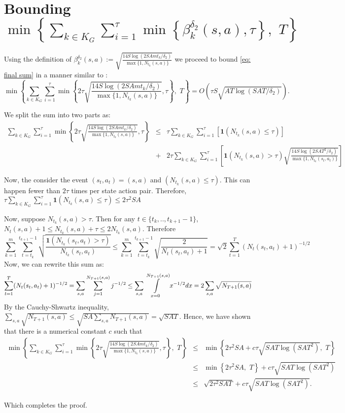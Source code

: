 \appendix
\section{Bounding $\min \left\{\sum_{k\in K_G} \sum_{i=1}^{\tau} \min\left\{ \beta_k^{\delta_2}(s,a), \tau\right\}, \,\, T \right\}$} 

Using the definition of $\beta_k^{\delta_2}(s,a) := \sqrt{\frac{14 S \log(2SAm t_k / \delta_{2})}{\max \{1,N_{t_k}(s,a) \}} }$
we proceed to bound \eqref{eq: final sum} in a manner similar to \cite{jaksch2010near}:
$$ \min \left\{\sum_{k\in K_G} \sum_{i=1}^{\tau} \min\left\{ 2\tau\sqrt{\frac{14 S \log(2SAm t_k / \delta_2)}{\max \{1,N_{t_k}(s,a) \}} }, \tau\right\}, \,\, T \right\}= O\left(\tau S \sqrt{ AT \log(SAT/ \delta_{2})}\right).$$

We split the sum into two parts as: 
\begin{eqnarray}	
\sum_{k\in K_G} \sum_{i=1}^{\tau} \min\left\{ 2\tau\sqrt{\frac{14 S \log(2SAm t_k / \delta_2)}{\max \{1,N_{t_k}(s,a) \}} }, \tau\right\} &\leq& \tau \sum_{k\in K_G}\sum_{i=1}^{\tau}\left[ \mathbf{1}(N_{t_k}(s,a) \leq \tau) \right] \\
&+& 2\tau \sum_{k\in K_G}\sum_{i=1}^{\tau}\left[ \mathbf{1}(N_{t_k}(s,a) > \tau)\sqrt{\frac{14 S \log(2SAT^2 / \delta_2)}{\max \{1,N_{t_k}(s_t,a_t) \}} }  \right] 
\end{eqnarray}

Now, the consider the event $(s_t, a_t)=(s,a)$ and $(N_{t_k}(s,a) \leq \tau)$. This can happen fewer than $2\tau$ times per state action pair. Therefore, $\tau \sum_{k\in K_G}\sum_{i=1}^{\tau}\mathbf{1}(N_{t_k}(s,a) \leq \tau) \leq 2\tau^2 SA$ 

Now, suppose $N_{t_k}(s,a)>\tau$. Then for any $t\in \{t_k,..,t_{k+1}-1\}$, $N_{t}(s,a)+1 \leq N_{t_k}(s,a)+\tau \leq 2N_{t_k}(s,a)$. Therefore 
\begin{equation}
 \sum_{k=1}^{m} \sum_{t=t_k}^{t_{k+1}-1} \sqrt{\frac{\mathbf{1}(N_{t_k}(s_t, a_t)>\tau)}{N_{t_k}(s_t,a_t)}} \leq \sum_{k=1}^{m} \sum_{t=t_k}^{t_{k+1}-1}  \sqrt{\frac{2}{N_{t}(s_t,a_t)+1}} = \sqrt{2} \sum_{t=1}^{T} (N_{t}(s_t, a_t)+1)^{-1/2}
\end{equation}
Now, we can rewrite this sum as: 
$$\sum_{t=1}^{T} (N_{t}(s_t, a_t)+1)^{-1/2} = \sum_{s,a} \sum_{j=1}^{N_{T+1}(s,a)} j^{-1/2} \leq \sum_{s,a} \intop_{x=0}^{N_{T+1}(s,a)} x^{-1/2} dx=2\sum_{s,a} \sqrt{N_{T+1}(s,a)}$$
By the Cauchy-Shwartz inequality, $\sum_{s,a} \sqrt{N_{T+1}(s,a)} \leq \sqrt{SA \sum_{s,a} N_{T+1}(s,a)} =\sqrt{SAT}$. Hence, we have shown that there is a numerical constant $c$ such that 
\begin{eqnarray}
\min \left\{\sum_{k\in K_G} \sum_{i=1}^{\tau} \min\left\{ 2\tau\sqrt{\frac{14 S \log(2SAm t_k / \delta_2)}{\max \{1,N_{t_k}(s,a) \}} }, \tau\right\}, \,\, T \right\} &\leq& \min\left\{ 2\tau^2 SA+c\tau\sqrt{SAT \log(SAT^2)}, \,\,T  \right\} \\
&\leq& \min\left\{ 2\tau^2 SA, \,\,T  \right\}+c\tau\sqrt{SAT \log(SAT^2)}\\
&\leq& \sqrt{2\tau^2 SAT}+c\tau\sqrt{SAT \log(SAT^2)}.
\end{eqnarray}

Which completes the proof.